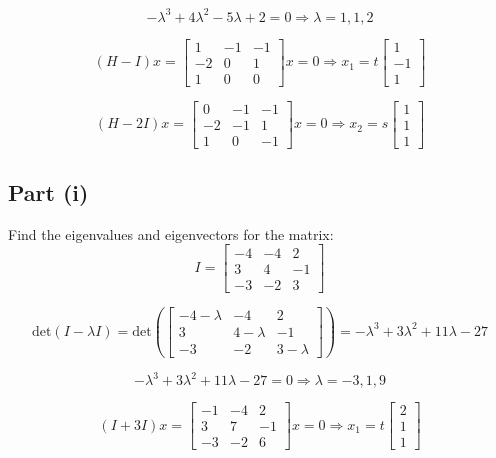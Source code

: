 \documentclass[12pt]{article}
\begin{document}
\[
  -\lambda^3 + 4\lambda^2 - 5\lambda + 2 = 0 \Rightarrow \lambda = 1, 1, 2
\]

\[
  (H - I)x = \begin{bmatrix} 1 & -1 & -1 \\ -2 & 0 & 1 \\ 1 & 0 & 0 \end{bmatrix}x = 0 \Rightarrow x_1 = t\begin{bmatrix} 1 \\ -1 \\ 1 \end{bmatrix}
\]

\[
  (H - 2I)x = \begin{bmatrix} 0 & -1 & -1 \\ -2 & -1 & 1 \\ 1 & 0 & -1 \end{bmatrix}x = 0 \Rightarrow x_2 = s\begin{bmatrix} 1 \\ 1 \\ 1 \end{bmatrix}
\]

\pagebreak

\subsection*{Part (i)}
Find the eigenvalues and eigenvectors for the matrix:
\[
  I = \begin{bmatrix} -4 & -4 & 2 \\ 3 & 4 & -1 \\ -3 & -2 & 3 \end{bmatrix}
\]

\[
  \text{det}(I - \lambda I) = \text{det}\left(\begin{bmatrix} -4-\lambda & -4 & 2 \\ 3 & 4-\lambda & -1 \\ -3 & -2 & 3-\lambda \end{bmatrix}\right) = -\lambda^3 + 3\lambda^2 + 11\lambda - 27
\]

\[
  -\lambda^3 + 3\lambda^2 + 11\lambda - 27 = 0 \Rightarrow \lambda = -3, 1, 9
\]

\[
  (I + 3I)x = \begin{bmatrix} -1 & -4 & 2 \\ 3 & 7 & -1 \\ -3 & -2 & 6 \end{bmatrix}x = 0 \Rightarrow x_1 = t\begin{bmatrix} 2 \\ 1 \\ 1 \end{bmatrix}
\]
\end{document}
